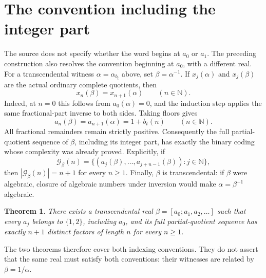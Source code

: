 \documentclass[11pt]{article}
\newtheorem{theorem}{Theorem}
\newcommand{\N}{\mathbb N}
\begin{document}
\section{The convention including the integer part}
The source does not specify whether the word begins at $a_0$ or $a_1$. The preceding construction also resolves the convention beginning at $a_0$, with a different real. For a transcendental witness $\alpha=\alpha_{b_t}$ above, set $\beta=\alpha^{-1}$. If $x_j(\alpha)$ and $x_j(\beta)$ are the actual ordinary complete quotients, then
\[
 x_n(\beta)=x_{n+1}(\alpha)\qquad(n\in\N).
\]
Indeed, at $n=0$ this follows from $a_0(\alpha)=0$, and the induction step applies the same fractional-part inverse to both sides. Taking floors gives
\[
 a_n(\beta)=a_{n+1}(\alpha)=1+b_t(n)\qquad(n\in\N).
\]
All fractional remainders remain strictly positive. Consequently the full partial-quotient sequence of $\beta$, including its integer part, has exactly the binary coding whose complexity was already proved. Explicitly, if
\[
 \mathcal G_\beta(n)=
 \{(a_j(\beta),\ldots,a_{j+n-1}(\beta)):j\in\N\},
\]
then $|\mathcal G_\beta(n)|=n+1$ for every $n\geq1$. Finally, $\beta$ is transcendental: if $\beta$ were algebraic, closure of algebraic numbers under inversion would make $\alpha=\beta^{-1}$ algebraic.

\begin{theorem}
There exists a transcendental real $\beta=[a_0;a_1,a_2,\ldots]$ such that every $a_j$ belongs to $\{1,2\}$, including $a_0$, and its full partial-quotient sequence has exactly $n+1$ distinct factors of length $n$ for every $n\geq1$.
\end{theorem}
The two theorems therefore cover both indexing conventions. They do not assert that the same real must satisfy both conventions: their witnesses are related by $\beta=1/\alpha$.
\end{document}
